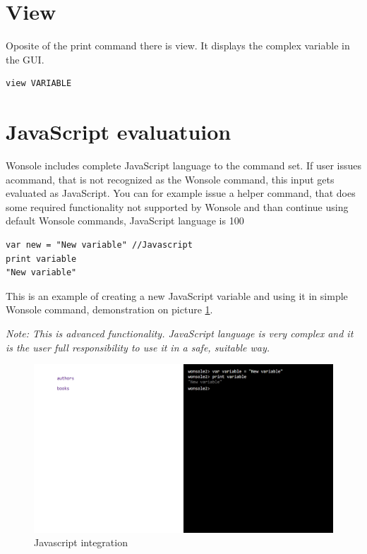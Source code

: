 \documentclass[10pt,a4paper,oneside]{report}
\begin{document}
\section{View}
Oposite of the print command there is view. It displays the complex variable in
the GUI.
\begin{verbatim}
view VARIABLE
\end{verbatim}

\section{JavaScript evaluatuion}
Wonsole includes complete JavaScript language to the command set. If user issues
acommand, that is not recognized as the Wonsole command, this input gets
evaluated as JavaScript. You can for example issue a helper command, that does
some required functionality not supported by Wonsole and than continue using
default Wonsole commands, JavaScript language is 100%

\begin{verbatim}
var new = "New variable" //Javascript
print variable
"New variable"
\end{verbatim}

This is an example of creating a new JavaScript variable and using it in simple
Wonsole command, demonstration on picture \ref{wonsole2-15}.

\textit{Note: This is advanced functionality. JavaScript language is very
complex and it is the user full responsibility to use it in a safe, suitable
way.}
 

\begin{figure}
\centering
\includegraphics[width=\textwidth]{screenshot/wonsole2/wonsole2-15.png}
\caption{Javascript integration}
\label{wonsole2-15}
\end{figure}
\end{document}

